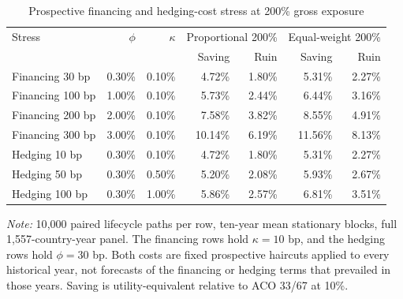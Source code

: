 \begin{table}[H]
\centering
\caption{Prospective financing and hedging-cost stress at 200\% gross exposure}
\label{tab:central-cost-sensitivity}
\small\setlength{\tabcolsep}{3.5pt}
\begin{tabular}{lrrrrrr}
\toprule
Stress & $\phi$ & $\kappa$ & \multicolumn{2}{c}{Proportional 200\%} & \multicolumn{2}{c}{Equal-weight 200\%} \\
 & & & Saving & Ruin & Saving & Ruin \\
\midrule
Financing 30 bp & 0.30\% & 0.10\% & 4.72\% & 1.80\% & 5.31\% & 2.27\% \\
Financing 100 bp & 1.00\% & 0.10\% & 5.73\% & 2.44\% & 6.44\% & 3.16\% \\
Financing 200 bp & 2.00\% & 0.10\% & 7.58\% & 3.82\% & 8.55\% & 4.91\% \\
Financing 300 bp & 3.00\% & 0.10\% & 10.14\% & 6.19\% & 11.56\% & 8.13\% \\
\addlinespace
Hedging 10 bp & 0.30\% & 0.10\% & 4.72\% & 1.80\% & 5.31\% & 2.27\% \\
Hedging 50 bp & 0.30\% & 0.50\% & 5.20\% & 2.08\% & 5.93\% & 2.67\% \\
Hedging 100 bp & 0.30\% & 1.00\% & 5.86\% & 2.57\% & 6.81\% & 3.51\% \\
\bottomrule
\end{tabular}
\begin{minipage}{0.97\textwidth}\footnotesize
\textit{Note:} 10{,}000 paired lifecycle paths per row, ten-year mean stationary blocks, full 1{,}557-country-year panel. The financing rows hold $\kappa=10$ bp, and the hedging rows hold $\phi=30$ bp. Both costs are fixed prospective haircuts applied to every historical year, not forecasts of the financing or hedging terms that prevailed in those years. Saving is utility-equivalent relative to ACO 33/67 at 10\%.
\end{minipage}
\end{table}
